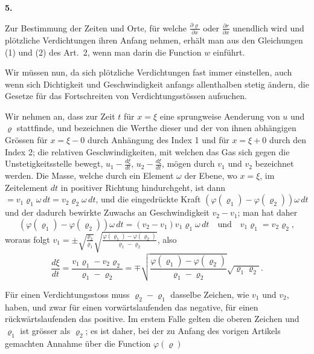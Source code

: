 \documentclass[12pt,a4paper]{article}
\begin{document}
\newpage
\begin{center}
\textbf{5.}
\end{center}

Zur Bestimmung der Zeiten und Orte, f\"ur welche $\frac{\partial\varrho}{\partial x}$ oder $\frac{\partial r}{\partial x}$ unendlich wird und pl\"otzliche Verdichtungen ihren Anfang nehmen, erh\"alt man aus den Gleichungen (1) und (2) des Art.~2, wenn man darin die Function $w$ einf\"uhrt.

Wir m\"ussen nun, da sich pl\"otzliche Verdichtungen fast immer einstellen, auch wenn sich Dichtigkeit und Geschwindigkeit anfangs allenthalben stetig \"andern, die Gesetze f\"ur das Fortschreiten von Verdichtungsst\"ossen aufsuchen.

Wir nehmen an, dass zur Zeit $t$ f\"ur $x = \xi$ eine sprungweise Aenderung von $u$ und $\varrho$ stattfinde, und bezeichnen die Werthe dieser und der von ihnen abh\"angigen Gr\"ossen f\"ur $x = \xi - 0$ durch Anh\"angung des Index 1 und f\"ur $x = \xi + 0$ durch den Index 2; die relativen Geschwindigkeiten, mit welchen das Gas sich gegen die Unstetigkeitsstelle bewegt, $u_{1} - \frac{d\xi}{dt}$, $u_{2} - \frac{d\xi}{dt}$, m\"ogen durch $v_{1}$ und $v_{2}$ bezeichnet werden. Die Masse, welche durch ein Element $\omega$ der Ebene, wo $x = \xi$, im Zeitelement $dt$ in positiver Richtung hindurchgeht, ist dann $= v_{1}\varrho_{1}\omega\,dt = v_{2}\varrho_{2}\omega\,dt$, und die eingedr\"uckte Kraft $(\varphi(\varrho_{1}) - \varphi(\varrho_{2}))\omega\,dt$ und der dadurch bewirkte Zuwachs an Geschwindigkeit $v_{2} - v_{1}$; man hat daher
\[
(\varphi(\varrho_{1}) - \varphi(\varrho_{2}))\omega\,dt = (v_{2} - v_{1})v_{1}\varrho_{1}\omega\,dt\quad\text{und}\quad v_{1}\varrho_{1} = v_{2}\varrho_{2},
\]
woraus folgt $v_{1} = \pm\sqrt{\frac{\varrho_{2}}{\varrho_{1}}}\sqrt{\frac{\varphi(\varrho_{1}) - \varphi(\varrho_{2})}{\varrho_{1} - \varrho_{2}}}$, also
\[
\frac{d\xi}{dt} = \frac{v_{1}\varrho_{1} - v_{2}\varrho_{2}}{\varrho_{1} - \varrho_{2}} = \mp\sqrt{\frac{\varphi(\varrho_{1}) - \varphi(\varrho_{2})}{\varrho_{1} - \varrho_{2}}}\sqrt{\varrho_{1}\varrho_{2}}.\tag{1}
\]

F\"ur einen Verdichtungsstoss muss $\varrho_{2} - \varrho_{1}$ dasselbe Zeichen, wie $v_{1}$ und $v_{2}$, haben, und zwar f\"ur einen vorw\"artslaufenden das negative, f\"ur einen r\"uckw\"artslaufenden das positive. Im erstem Falle gelten die oberen Zeichen und $\varrho_{1}$ ist gr\"osser als $\varrho_{2}$; es ist daher, bei der zu Anfang des vorigen Artikels gemachten Annahme \"uber die Function $\varphi(\varrho)$
\end{document}
